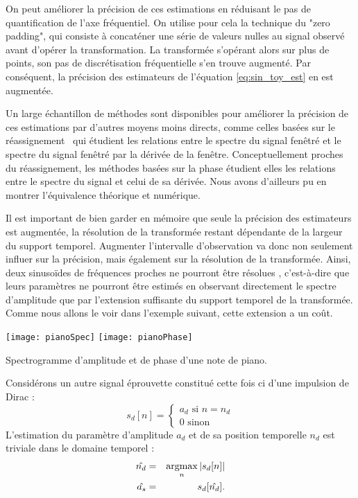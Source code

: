 On peut améliorer la précision de ces estimations en réduisant le pas de quantification de l'axe fréquentiel. On utilise pour cela la technique du "zero padding", qui consiste à concaténer une série de valeurs nulles au signal observé avant d'opérer la transformation. La transformée s'opérant alors sur plus de points, son pas de discrétisation fréquentielle s'en trouve augmenté. Par conséquent, la précision des estimateurs de l'équation \ref{eq:sin_toy_est} en est augmentée.

Un large échantillon de méthodes sont disponibles pour améliorer la précision de ces estimations par d'autres moyens moins directs, comme  celles basées sur le réassignement~\cite{auger1995improving} qui étudient les relations entre le spectre du signal fenêtré et le spectre du signal fenêtré par la dérivée de la fenêtre. Conceptuellement proches du réassignement, les méthodes basées sur la phase étudient elles les relations entre le spectre du signal et celui de sa dérivée. Nous avons d'ailleurs pu en montrer l'équivalence théorique et numérique.~\cite{lagrangeJaes07}

Il est important de bien garder en mémoire que seule la précision des estimateurs est augmentée, la résolution de la transformée restant dépendante de la largeur du support temporel.  Augmenter l'intervalle d'observation va donc non seulement influer sur la précision, mais également sur la résolution de la transformée. Ainsi, deux sinusoïdes de fréquences proches ne pourront être \og résolues \fg, c'est-à-dire que leurs paramètres ne pourront être estimés en observant directement le spectre d'amplitude que par l'extension suffisante du support temporel de la transformée. Comme nous allons le voir dans l'exemple suivant, cette extension a un coût.


\begin{marginfigure}
  \texttt{[image: pianoSpec]}
  \texttt{[image: pianoPhase]}
  \caption{Spectrogramme d'amplitude et de phase d'une note de piano.}
  \label{fig:phase}
\end{marginfigure}

Considérons un autre signal \og éprouvette \fg constitué cette fois ci d'une impulsion de Dirac :
\begin{equation}
  s_d[n] = \begin{cases}
    a_d \text{ si } n=n_d \\
    0 \text{ sinon}
\end{cases}
\end{equation}
L'estimation du paramètre d'amplitude $a_d$ et de sa position temporelle $n_d$ est triviale dans le domaine temporel :
\begin{eqnarray}
  \hat{n_d} &=&  \operatorname*{argmax}_n | s_d[n] | \\
  \hat{a_s} &=&  s_d[\hat{n_d}].
\end{eqnarray}

